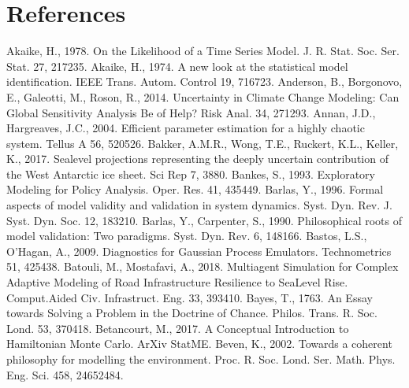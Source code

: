 \documentclass[letterpaper,10pt,english]{sphinxmanual}
\begin{document}
\chapter{References}
\label{\detokenize{8_references:references}}\label{\detokenize{8_references::doc}}
\sphinxAtStartPar
Akaike, H., 1978. On the Likelihood of a Time Series Model. J. R. Stat. Soc. Ser. Stat. 27, 217\textendash{}235. 
Akaike, H., 1974. A new look at the statistical model identification. IEEE Trans. Autom. Control 19, 716\textendash{}723. 
Anderson, B., Borgonovo, E., Galeotti, M., Roson, R., 2014. Uncertainty in Climate Change Modeling: Can Global Sensitivity Analysis Be of Help? Risk Anal. 34, 271\textendash{}293. 
Annan, J.D., Hargreaves, J.C., 2004. Efficient parameter estimation for a highly chaotic system. Tellus A 56, 520\textendash{}526. 
Bakker, A.M.R., Wong, T.E., Ruckert, K.L., Keller, K., 2017. Sea\sphinxhyphen{}level projections representing the deeply uncertain contribution of the West Antarctic ice sheet. Sci Rep 7, 3880. 
Bankes, S., 1993. Exploratory Modeling for Policy Analysis. Oper. Res. 41, 435\textendash{}449. 
Barlas, Y., 1996. Formal aspects of model validity and validation in system dynamics. Syst. Dyn. Rev. J. Syst. Dyn. Soc. 12, 183\textendash{}210.
Barlas, Y., Carpenter, S., 1990. Philosophical roots of model validation: Two paradigms. Syst. Dyn. Rev. 6, 148\textendash{}166. 
Bastos, L.S., O’Hagan, A., 2009. Diagnostics for Gaussian Process Emulators. Technometrics 51, 425\textendash{}438. 
Batouli, M., Mostafavi, A., 2018. Multiagent Simulation for Complex Adaptive Modeling of Road Infrastructure Resilience to Sea\sphinxhyphen{}Level Rise. Comput.\sphinxhyphen{}Aided Civ. Infrastruct. Eng. 33, 393\textendash{}410. 
Bayes, T., 1763. An Essay towards Solving a Problem in the Doctrine of Chance. Philos. Trans. R. Soc. Lond. 53, 370\textendash{}418.
Betancourt, M., 2017. A Conceptual Introduction to Hamiltonian Monte Carlo. ArXiv StatME.
Beven, K., 2002. Towards a coherent philosophy for modelling the environment. Proc. R. Soc. Lond. Ser. Math. Phys. Eng. Sci. 458, 2465\textendash{}2484. 
\end{document}
